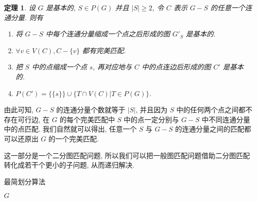 \documentclass[a4paper]{article}
\newtheorem{theorem}{\hspace{2em}定理}
\begin{document}
				\begin{theorem}
					设 $G$ 是基本的, $S\in P(G)$ 并且 $|S| \ge 2$, 令 $C$ 表示 $G - S$ 的任意一个连通分量. 则有

					\begin{enumerate}
						\item 将 $G - S$ 中每个连通分量缩成一个点之后形成的图 $G'_S$ 是基本的.
						\item $\forall v \in V(C), C - \{v\}$ 都有完美匹配.
						\item 把 $S$ 中的点缩成一个点 $s$, 再对应地与 $C$ 中的点连边后形成的图 $C'$ 是基本的.
						\item $P(C') = \{\{s\}\} \cup \{T \cap V(C) | T \in P(G)\}$.
					\end{enumerate}

					\label{canonical}
				\end{theorem}
				
				由此可知, $G - S$ 的连通分量个数就等于 $|S|$, 并且因为 $S$ 中的任何两个点之间都不存在可行边, 在 $G$ 的每个完美匹配中 $S$ 中的点一定分别与 $G - S$ 中不同连通分量中的点匹配. 我们自然就可以得出, 任意一个 $S$ 与 $G - S$ 的连通分量之间的匹配都可以还原出 $G$ 的一个完美匹配.
				
				这一部分是一个二分图匹配问题, 所以我们可以把一般图匹配问题借助二分图匹配转化成若干个更小的子问题, 从而递归解决.

				\begin{algorithm}
					\caption{最简划分算法}
					\label{partition}

					\begin{algorithmic}[1]
						 {$G$}
							\Else
								\Else
								\EndIf
							\EndIf
						\EndFunction
					\end{algorithmic}
				\end{algorithm}
\end{document}
